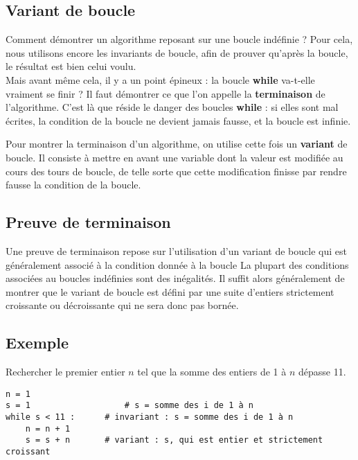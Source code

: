 \subsection{Variant de boucle}

Comment démontrer un 
algorithme reposant sur une boucle indéfinie ? Pour cela, nous utilisons encore les invariants de 
boucle, afin de prouver qu'après la boucle, le résultat est bien celui voulu.\\
Mais avant même cela, il y a un point épineux : la boucle \textbf{while} va-t-elle vraiment se 
finir ? Il faut démontrer ce que l'on appelle la \textbf{terminaison} de l'algorithme. C'est là que 
réside le danger des boucles \textbf{while} : si elles sont mal écrites, la condition de la boucle 
ne devient jamais fausse, et la boucle est infinie.\\

\begin{defi}
Pour montrer la terminaison d'un algorithme, on utilise cette fois un \textbf{variant} de boucle. 
Il consiste à mettre en avant une variable dont la valeur est modifiée au cours des tours de 
boucle, de telle sorte que cette modification finisse par rendre fausse la condition de la boucle.\\
\end{defi}


\subsection{Preuve de terminaison}


\begin{defi}
Une preuve de terminaison repose sur l'utilisation d'un variant de boucle qui est généralement associé à la condition donnée à la boucle  La plupart des conditions associées au boucles indéfinies sont des inégalités. Il suffit alors généralement de montrer que le variant de boucle est défini par une suite d'entiers strictement croissante ou décroissante qui ne sera donc pas bornée.
\end{defi}

\subsection{Exemple}


\begin{exemple}
Rechercher le premier entier $n$ tel que la somme des entiers de 1 à $n$ dépasse 11.

\begin{lstlisting}
n = 1
s = 1           		# s = somme des i de 1 à n
while s < 11 :  	# invariant : s = somme des i de 1 à n
    n = n + 1
    s = s + n   	# variant : s, qui est entier et strictement croissant
\end{lstlisting}
\end{exemple}